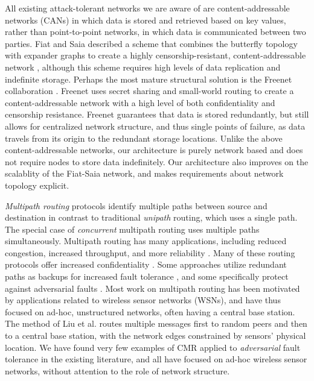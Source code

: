 \documentclass[10pt,letterpaper]{article}
\begin{document}
All existing attack-tolerant networks we are aware of are content-addressable
networks (CANs) in which data is stored and retrieved based on key values,
rather than point-to-point networks, in which data is communicated between
two parties.
Fiat and Saia described a scheme that combines the butterfly topology
with expander graphs to create a highly censorship-resistant,
content-addressable network \cite{fiat_censorship_2002},
although this scheme requires high levels of data replication and indefinite
storage.
Perhaps the most mature structural solution is the Freenet collaboration
\cite{clarke_freenet:_2001}.
Freenet uses secret sharing
\cite{shamir_how_1979, blakley_safeguarding_1979}
and small-world routing
\cite{zhang_using_2002,kleinberg_small-world_2000}
to create a content-addressable network with a high level of both
confidentiality and censorship resistance.
Freenet guarantees that data is stored redundantly,
but still allows for centralized network structure,
and thus single points of failure,
as data travels from its origin to the redundant storage locations.
Unlike the above content-addressable networks, our architecture is purely network based
and does not require nodes to store data indefinitely.
Our architecture also improves on the scalablity of the Fiat-Saia network,
and makes requirements about network topology explicit.

{\em Multipath routing} protocols identify multiple paths between
source and destination
in contrast to traditional {\em unipath} routing, which uses
a single path.
The special case of {\em concurrent} multipath routing uses multiple paths
simultaneously.
Multipath routing has many applications, including reduced congestion,
increased throughput, and more reliability
\cite{qadir_exploiting_2015}.
Many of these routing protocols offer increased confidentiality
\cite{zin_survey_2015}.
Some approaches utilize redundant paths as backups for increased
fault tolerance
\cite{alrajeh_secure_2013},
and some specifically protect against adversarial faults
\cite{kohno_improvement_2012, khalil_unmask:_2010, lou_h-spread:_2006}.
Most work on multipath routing has been motivated by applications related to
wireless sensor networks (WSNs),
and have thus focused on ad-hoc, unstructured networks, often having a central
base station.
The method of Liu et al.
\cite{liu_secure_2012}
routes multiple messages first to random peers and then
to a central base station,
with the network edges constrained by sensors' physical location.
We have found very few examples of CMR applied to {\em adversarial}
fault tolerance in the existing literature,
and all have focused on ad-hoc wireless sensor networks, without attention
to the role of network structure.
\end{document}
